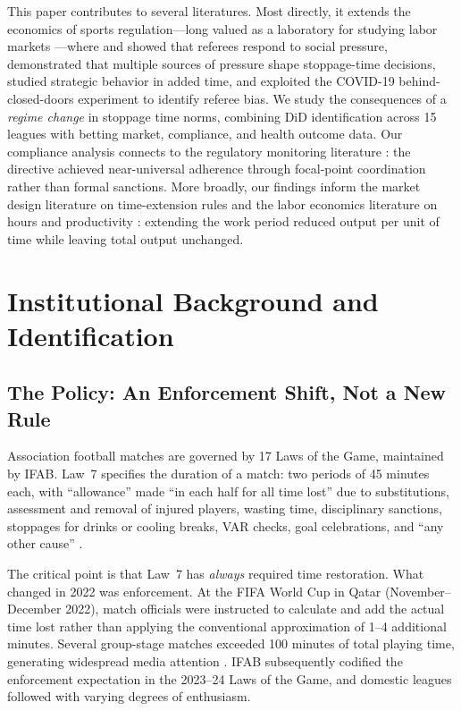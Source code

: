 \documentclass[12pt]{article}
\begin{document}
This paper contributes to several literatures. Most directly, it extends the economics of sports regulation---long valued as a laboratory for studying labor markets \citep{kahn2000case}---where \citet{garicano2005favoritism} and \citet{dohmen2008professionals} showed that referees respond to social pressure, \citet{bekes2024favoritism} demonstrated that multiple sources of pressure shape stoppage-time decisions, \citet{butler2026objective} studied strategic behavior in added time, and \citet{kocsoy2025referee} exploited the COVID-19 behind-closed-doors experiment to identify referee bias. We study the consequences of a \emph{regime change} in stoppage time norms, combining DiD identification across 15 leagues with betting market, compliance, and health outcome data. Our compliance analysis connects to the regulatory monitoring literature \citep{duflo2013truth}: the directive achieved near-universal adherence through focal-point coordination rather than formal sanctions. More broadly, our findings inform the market design literature on time-extension rules \citep{rothockenfels2002} and the labor economics literature on hours and productivity \citep{pencavel2015effects}: extending the work period reduced output per unit of time while leaving total output unchanged.


\section{Institutional Background and Identification}
\label{sec:background}

\subsection{The Policy: An Enforcement Shift, Not a New Rule}

Association football matches are governed by 17 Laws of the Game, maintained by IFAB. Law~7 specifies the duration of a match: two periods of 45 minutes each, with ``allowance'' made ``in each half for all time lost'' due to substitutions, assessment and removal of injured players, wasting time, disciplinary sanctions, stoppages for drinks or cooling breaks, VAR checks, goal celebrations, and ``any other cause'' \citep{ifab2023laws}.

The critical point is that Law~7 has \textit{always} required time restoration. What changed in 2022 was enforcement. At the FIFA World Cup in Qatar (November--December 2022), match officials were instructed to calculate and add the actual time lost rather than applying the conventional approximation of 1--4 additional minutes. Several group-stage matches exceeded 100 minutes of total playing time, generating widespread media attention \citep{wei2024goal, lames2024goal}. IFAB subsequently codified the enforcement expectation in the 2023--24 Laws of the Game, and domestic leagues followed with varying degrees of enthusiasm.
\end{document}
